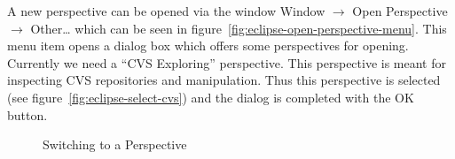 \documentclass{extex-doc}
\newcommand\menu{\textsf}
\newcommand\sub{\(\rightarrow\) }
\begin{document}
A new perspective can be opened via the window \menu{Window \sub Open
  Perspective \sub Other\ldots} which can be seen in
figure~\ref{fig:eclipse-open-perspective-menu}. This menu item opens a
dialog box which offers some perspectives for opening. Currently we
need a ``CVS Exploring'' perspective. This perspective is meant for
inspecting CVS repositories and manipulation. Thus this perspective is
selected (see figure~\ref{fig:eclipse-select-cvs}) and the dialog is
completed with the OK button.
\begin{figure}[ht]
  \hbox{}\hfill
  \hfill
  \hfill\hbox{}

  \caption{Switching to a Perspective}\label{fig:eclipse-perspective}
\end{figure}
\end{document}
